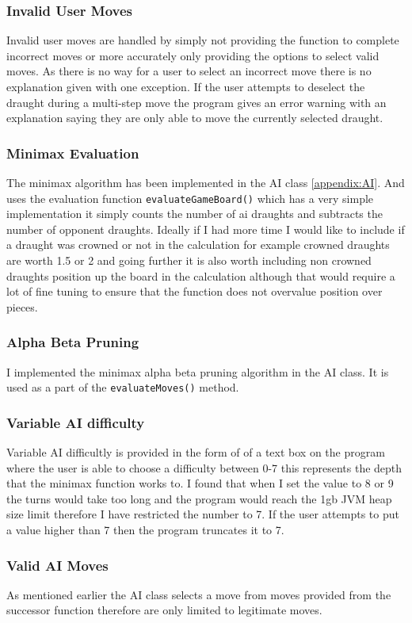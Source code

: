 \documentclass[a4paper,12pt]{scrartcl}
\begin{document}
{{			\subsubsection{Invalid User Moves}{Invalid user moves are handled by simply not providing the function to complete incorrect moves or more accurately only providing the options to select valid moves. As there is no way for a user to select an incorrect move there is no explanation given with one exception. If the user attempts to deselect the draught during a multi-step move the program gives an error warning with an explanation saying they are only able to move the currently selected draught.
			}
			\subsubsection{Minimax Evaluation}{
				The minimax algorithm has been implemented in the AI class \cref{appendix:AI}. And uses the evaluation function \lstinline|evaluateGameBoard()| which has a very simple implementation it simply counts the number of ai draughts and subtracts the number of opponent draughts. Ideally if I had more time I would like to include if a draught was crowned or not in the calculation for example crowned draughts are worth 1.5 or 2 and going further it is also worth including non crowned draughts position up the board in the calculation although that would require a lot of fine tuning to ensure that the function does not overvalue position over pieces.
			}
			\subsubsection{Alpha Beta Pruning}
			{
				I implemented the minimax alpha beta pruning algorithm in the AI class. It is used as a part of the \lstinline|evaluateMoves()| method.
			}
			\subsubsection{Variable AI difficulty}{
				Variable AI difficultly is provided in the form of of a text box on the program where the user is able to choose a difficulty between 0-7 this represents the depth that the minimax function works to. I found that when I set the value to 8 or 9 the turns would take too long and the program would reach the 1gb JVM heap size limit therefore I have restricted the number to 7. If the user attempts to put a value higher than 7 then the program truncates it to 7.
			}
			\subsubsection{Valid AI Moves}{As mentioned earlier the AI class selects a move from moves provided from the successor function therefore are only limited to legitimate moves.}
}}
\end{document}
